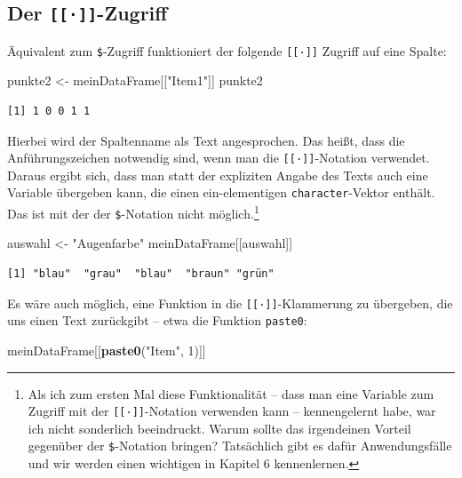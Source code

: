 \documentclass[12pt,]{tufte-book}
\newenvironment{Shaded}{\begin{snugshade}}{\end{snugshade}}
\newcommand{\KeywordTok}[1]{\textcolor[rgb]{0.13,0.29,0.53}{\textbf{#1}}}
\newcommand{\DecValTok}[1]{\textcolor[rgb]{0.00,0.00,0.81}{#1}}
\newcommand{\StringTok}[1]{\textcolor[rgb]{0.31,0.60,0.02}{#1}}
\newcommand{\NormalTok}[1]{#1}
\theoremstyle{definition}
\theoremstyle{definition}
\theoremstyle{definition}
\theoremstyle{remark}
\begin{document}
\subsection{\texorpdfstring{Der
\texttt{{[}{[}·{]}{]}}-Zugriff}{Der {[}{[}·{]}{]}-Zugriff}}\label{der--zugriff}

Äquivalent zum \texttt{\$}-Zugriff funktioniert der folgende
\texttt{{[}{[}·{]}{]}} Zugriff auf eine Spalte:

\begin{Shaded}
\begin{Highlighting}[]
\NormalTok{punkte2 <-}\StringTok{ }\NormalTok{meinDataFrame[[}\StringTok{"Item1"}\NormalTok{]]}
\NormalTok{punkte2}
\end{Highlighting}
\end{Shaded}

\begin{verbatim}
[1] 1 0 0 1 1
\end{verbatim}

Hierbei wird der Spaltenname als Text angesprochen. Das heißt, dass die
Anführungszeichen notwendig sind, wenn man die
\texttt{{[}{[}·{]}{]}}-Notation verwendet. Daraus ergibt sich, dass man
statt der expliziten Angabe des Texts auch eine Variable übergeben kann,
die einen ein-elementigen \texttt{character}-Vektor enthält. Das ist mit
der der \texttt{\$}-Notation nicht möglich.\footnote{Als ich zum ersten
  Mal diese Funktionalität -- dass man eine Variable zum Zugriff mit der
  \texttt{{[}{[}·{]}{]}}-Notation verwenden kann -- kennengelernt habe,
  war ich nicht sonderlich beeindruckt. Warum sollte das irgendeinen
  Vorteil gegenüber der \texttt{\$}-Notation bringen? Tatsächlich gibt
  es dafür Anwendungsfälle und wir werden einen wichtigen in Kapitel 6
  kennenlernen.}

\begin{Shaded}
\begin{Highlighting}[]
\NormalTok{auswahl <-}\StringTok{ "Augenfarbe"}
\NormalTok{meinDataFrame[[auswahl]]}
\end{Highlighting}
\end{Shaded}

\begin{verbatim}
[1] "blau"  "grau"  "blau"  "braun" "grün" 
\end{verbatim}

Es wäre auch möglich, eine Funktion in die
\texttt{{[}{[}·{]}{]}}-Klammerung zu übergeben, die uns einen Text
zurückgibt -- etwa die Funktion \texttt{paste0}:

\begin{Shaded}
\begin{Highlighting}[]
\NormalTok{meinDataFrame[[}\KeywordTok{paste0}\NormalTok{(}\StringTok{"Item"}\NormalTok{, }\DecValTok{1}\NormalTok{)]]}
\end{Highlighting}
\end{Shaded}
\end{document}
